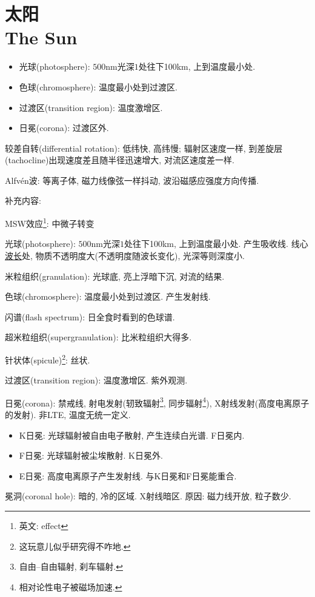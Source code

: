 \chapter{太阳\\The Sun}

\begin{itemize}
    \item 光球(photosphere): $500\text{nm}$光深$1$处往下100km, 上到温度最小处.
    \item 色球(chromosphere): 温度最小处到过渡区.
    \item 过渡区(transition region): 温度激增区.
    \item 日冕(corona): 过渡区外.
\end{itemize}

较差自转(differential rotation): 低纬快, 高纬慢; 辐射区速度一样, 到差旋层(tachocline)出现速度差且随半径迅速增大, 对流区速度差一样.

Alfv\'en波: 等离子体, 磁力线像弦一样抖动, 波沿磁感应强度方向传播.

补充内容:

MSW效应\footnote{英文: effect}: 中微子转变

光球(photosphere): $500\text{nm}$光深$1$处往下100km, 上到温度最小处. 产生吸收线. 线心\underline{波长}$\!\!$处, 物质不透明度大(不透明度随波长变化), 光深等则深度小.

米粒组织(granulation): 光球底, 亮上浮暗下沉, 对流的结果.

色球(chromosphere): 温度最小处到过渡区. 产生发射线.

闪谱(flash spectrum): 日全食时看到的色球谱.

超米粒组织(supergranulation): 比米粒组织大得多.

针状体(spicule)\footnote{这玩意儿似乎研究得不咋地.}: 丝状.

过渡区(transition region): 温度激增区. 紫外观测.

日冕(corona): 禁戒线, 射电发射(轫致辐射\footnote{
    自由--自由辐射, 刹车辐射.
}, 同步辐射\footnote{
    相对论性电子被磁场加速.
}), X射线发射(高度电离原子的发射). 非LTE, 温度无统一定义.
\begin{itemize}
    \item K日冕: 光球辐射被自由电子散射, 产生连续白光谱. F日冕内.
    \item F日冕: 光球辐射被尘埃散射. K日冕外.
    \item E日冕: 高度电离原子产生发射线. 与K日冕和F日冕能重合.
\end{itemize}

冕洞(coronal hole): 暗的, 冷的区域. X射线暗区. 原因: 磁力线开放, 粒子数少.

